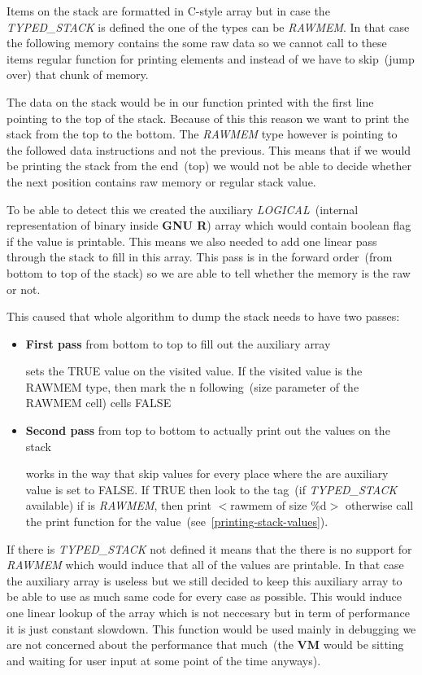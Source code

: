 \documentclass[thesis=M,english]{FITthesis}[2018/10/20]
\begin{document}
Items on the stack are formatted in C-style array but in case the \textit{TYPED{\_}STACK} is defined the one of the types can be \textit{RAWMEM}. In that case the following memory contains the some raw data so we cannot call to these items regular function for printing elements and instead of we have to skip~(jump over) that chunk of memory.

The data on the stack would be in our function printed with the first line pointing to the top of the  stack. Because of this this reason we want to print the stack from the top to the bottom. The \textit{RAWMEM} type however is pointing to the followed data instructions and not the previous. This means that if we would be printing the stack from the end~(top) we would not be able to decide whether the next position contains raw memory or regular stack value.

To be able to detect this we created the auxiliary \textit{LOGICAL}~(internal representation of binary inside \textbf{GNU R}) array which would contain boolean flag if the value is printable. This means we also needed to add one linear pass through the stack to fill in this array. This pass is in the forward order~(from bottom to top of the stack) so we are able to tell whether the memory is the raw or not. 

This caused that whole algorithm to dump the stack needs to have two passes:

\begin{itemize}
	\item \textbf{First pass} from bottom to top to fill out the auxiliary array
	
			sets the TRUE value on the visited value. If the visited value is the RAWMEM type, then mark the n following~(size parameter of the RAWMEM cell) cells FALSE

	\item \textbf{Second pass} from top to bottom to actually print out the values on the stack
	
			works in the way that skip values for every place where the are auxiliary value is set to FALSE. If TRUE then look to the tag~(if \textit{TYPED{\_}STACK} available) if is \textit{RAWMEM}, then print $<$rawmem of size \%d$>$ otherwise call the print function for the value~(see~\ref{printing-stack-values}).
\end{itemize}

If there is \textit{TYPED{\_}STACK} not defined it means that the there is no support for \textit{RAWMEM} which would induce that all of the values are printable. In that case the auxiliary array is useless but we still decided to keep this auxiliary array to be able to use as much same code for every case as possible. This would induce one linear lookup of the array which is not neccesary but in term of performance it is just constant slowdown. This function would be used mainly in debugging we are not concerned about the performance that much~(the \textbf{VM} would be sitting and waiting for user input at some point of the time anyways).
\end{document}
